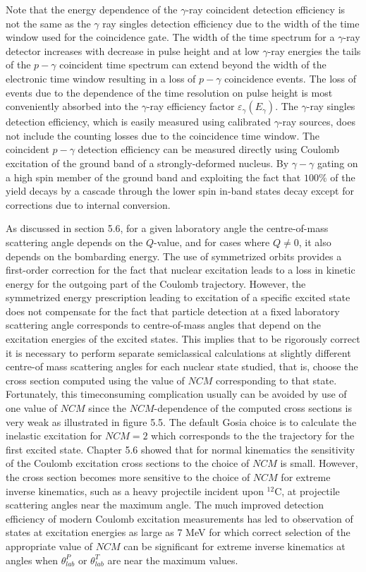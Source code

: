 \documentclass[10pt]{article}
\begin{document}
Note that the energy dependence of the $\gamma$-ray coincident detection efficiency is not the same as the $\gamma$ ray singles detection efficiency due to the width of the time window used for the coincidence gate. The width of the time spectrum for a $\gamma$-ray detector increases with decrease in pulse height and at low $\gamma$-ray energies the tails of the $p-\gamma$ coincident time spectrum can extend beyond the width of the electronic time window resulting in a loss of $p-\gamma$ coincidence events. The loss of events due to the dependence of the time resolution on pulse height is most conveniently absorbed into the $\gamma$-ray efficiency factor $\varepsilon_{\gamma}\left(E_{\gamma}\right)$. The $\gamma$-ray singles detection efficiency, which is easily measured using calibrated $\gamma$-ray sources, does not include the counting losses due to the coincidence time window. The coincident $p-\gamma$ detection efficiency can be measured directly using Coulomb excitation of the ground band of a strongly-deformed nucleus. By $\gamma-\gamma$ gating on a high spin member of the ground band and exploiting the fact that $100 \%$ of the yield decays by a cascade through the lower spin in-band states decay except for corrections due to internal conversion.

As discussed in section 5.6, for a given laboratory angle the centre-of-mass scattering angle depends on the $Q$-value, and for cases where $Q \neq 0$, it also depends on the bombarding energy. The use of symmetrized orbits provides a first-order correction for the fact that nuclear excitation leads to a loss in kinetic energy for the outgoing part of the Coulomb trajectory. However, the symmetrized energy prescription leading to excitation of a specific excited state does not compensate for the fact that particle detection at a fixed laboratory scattering angle corresponds to centre-of-mass angles that depend on the excitation energies of the excited states. This implies that to be rigorously correct it is necessary to perform separate semiclassical calculations at slightly different centre-of mass scattering angles for each nuclear state studied, that is, choose the cross section computed using the value of $N C M$ corresponding to that state. Fortunately, this timeconsuming complication usually can be avoided by use of one value of $N C M$ since the $N C M$-dependence of the computed cross sections is very weak as illustrated in figure 5.5. The default Gosia choice is to calculate the inelastic excitation for $N C M=2$ which corresponds to the the trajectory for the first excited state. Chapter 5.6 showed that for normal kinematics the sensitivity of the Coulomb excitation cross sections to the choice of $N C M$ is small. However, the cross section becomes more sensitive to the choice of $N C M$ for extreme inverse kinematics, such as a heavy projectile incident upon ${ }^{12} \mathrm{C}$, at projectile scattering angles near the maximum angle. The much improved detection efficiency of modern Coulomb excitation measurements has led to observation of states at excitation energies as large as 7 MeV for which correct selection of the appropriate value of $N C M$ can be significant for extreme inverse kinematics at angles when $\theta_{l a b}^{P}$ or $\theta_{l a b}^{T}$ are near the maximum values.
\end{document}
